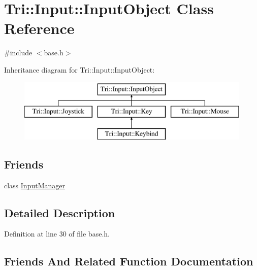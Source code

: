 \hypertarget{class_tri_1_1_input_1_1_input_object}{}\section{Tri\+:\+:Input\+:\+:Input\+Object Class Reference}
\label{class_tri_1_1_input_1_1_input_object}


{\ttfamily \#include $<$base.\+h$>$}

Inheritance diagram for Tri\+:\+:Input\+:\+:Input\+Object\+:\begin{figure}[H]
\begin{center}
\leavevmode
\includegraphics[height=3.000000cm]{class_tri_1_1_input_1_1_input_object}
\end{center}
\end{figure}
\subsection*{Friends}
\begin{DoxyCompactItemize}
\item 
class \hyperlink{class_tri_1_1_input_1_1_input_object_af0e8c3dcc20b7ddcaf63506363a22821}{Input\+Manager}
\end{DoxyCompactItemize}


\subsection{Detailed Description}


Definition at line 30 of file base.\+h.



\subsection{Friends And Related Function Documentation}
\hypertarget{class_tri_1_1_input_1_1_input_object_af0e8c3dcc20b7ddcaf63506363a22821}{}
